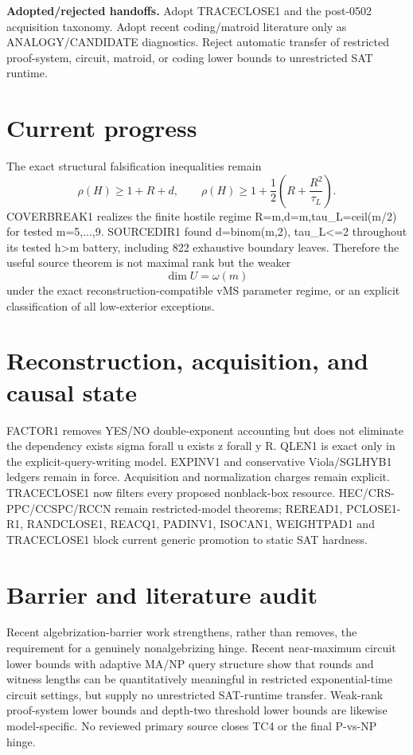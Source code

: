 \documentclass[11pt]{article}\usepackage[margin=.86in]{geometry}\usepackage{amsmath,amssymb}
\begin{document}
\textbf{Adopted/rejected handoffs.} Adopt TRACECLOSE1 and the post-0502 acquisition taxonomy. Adopt recent coding/matroid literature only as ANALOGY/CANDIDATE diagnostics. Reject automatic transfer of restricted proof-system, circuit, matroid, or coding lower bounds to unrestricted SAT runtime.

\section*{Current progress}
The exact structural falsification inequalities remain
\[
\rho(H)\ge1+R+d,\qquad
\rho(H)\ge1+\frac12\left(R+\frac{R^2}{\tau_L}\right).
\]
COVERBREAK1 realizes the finite hostile regime R=m,d=m,tau_L=ceil(m/2) for tested m=5,...,9. SOURCEDIR1 found d=binom(m,2), tau_L<=2 throughout its tested h>m battery, including 822 exhaustive boundary leaves. Therefore the useful source theorem is not maximal rank but the weaker
\[
\boxed{\dim U=\omega(m)}
\]
under the exact reconstruction-compatible vMS parameter regime, or an explicit classification of all low-exterior exceptions.

\section*{Reconstruction, acquisition, and causal state}
FACTOR1 removes YES/NO double-exponent accounting but does not eliminate the dependency exists sigma forall u exists z forall y R. QLEN1 is exact only in the explicit-query-writing model. EXPINV1 and conservative Viola/SGLHYB1 ledgers remain in force. Acquisition and normalization charges remain explicit. TRACECLOSE1 now filters every proposed nonblack-box resource. HEC/CRS-PPC/CCSPC/RCCN remain restricted-model theorems; REREAD1, PCLOSE1-R1, RANDCLOSE1, REACQ1, PADINV1, ISOCAN1, WEIGHTPAD1 and TRACECLOSE1 block current generic promotion to static SAT hardness.

\section*{Barrier and literature audit}
Recent algebrization-barrier work strengthens, rather than removes, the requirement for a genuinely nonalgebrizing hinge. Recent near-maximum circuit lower bounds with adaptive MA/NP query structure show that rounds and witness lengths can be quantitatively meaningful in restricted exponential-time circuit settings, but supply no unrestricted SAT-runtime transfer. Weak-rank proof-system lower bounds and depth-two threshold lower bounds are likewise model-specific. No reviewed primary source closes TC4 or the final P-vs-NP hinge.
\end{document}

